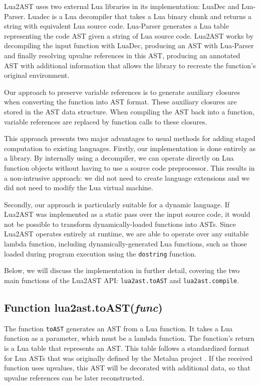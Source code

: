 \documentclass[english]{llncs}
\begin{document}
Lua2AST uses two external Lua libraries in its implementation: LuaDec and Lua-Parser.
Luadec \cite{luadec} is a Lua decompiler that takes a Lua binary chunk and returns a string with equivalent Lua source code.
Lua-Parser \cite{lua-parser} generates a Lua table representing the code AST given a string of Lua source code.
Lua2AST works by decompiling the input function with LuaDec, producing an AST with Lua-Parser
and finally resolving upvalue references in this AST, producing an annotated AST
with additional information that allows the library to recreate the function's original
environment.

Our approach to preserve variable references is to generate auxiliary closures
when converting the function into AST format. These auxiliary closures are
stored in the AST data structure. When compiling the AST back into a function,
variable references are replaced by function calls to these closures.

This approach presents two major advantages to usual methods for adding staged computation to existing languages.
Firstly, our implementation is done entirely as a library.
By internally using a decompiler, we can operate directly on Lua function objects
without having to use a source code preprocessor.
This results in a non-intrusive approach: we did not need to create language extensions and we did not need to modify the Lua virtual machine.

Secondly, our approach is particularly suitable for a dynamic language.
If Lua2AST was implemented as a static pass over the input source code,
it would not be possible to transform dynamically-loaded functions into ASTs.
Since Lua2AST operates entirely at runtime, we are able to operate over
any suitable lambda function, including dynamically-generated Lua functions,
such as those loaded during program execution using the \texttt{dostring} function.

Below, we will discuss the implementation in further detail, covering the two main functions
of the Lua2AST API: \texttt{lua2ast.toAST} and \texttt{lua2ast.compile}.

\subsection{Function lua2ast.toAST(\emph{func})}

The function \texttt{toAST} generates an AST from a Lua function.
It takes a Lua function as a parameter, which must be a lambda function.
The function's return is a Lua table that represents an AST.
This table follows a standardized format for Lua ASTs that was originally defined by the Metalua project \cite{metalua}.
If the received function uses upvalues, this AST will be decorated with additional data, so that upvalue references
can be later reconstructed.
\end{document}
